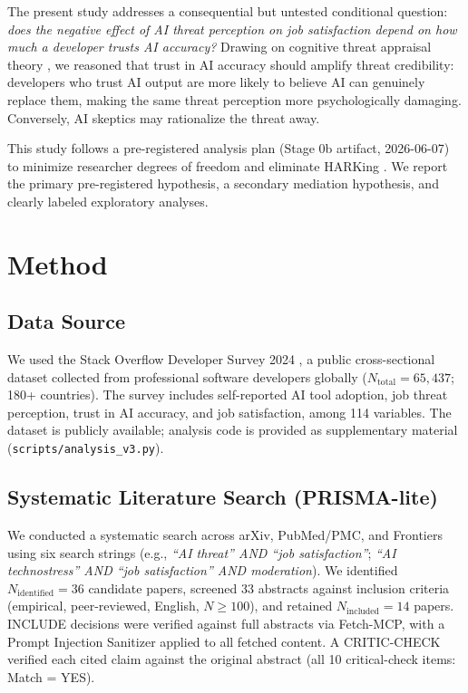 \documentclass[11pt]{article}
\begin{document}
The present study addresses a consequential but untested conditional question:
\textit{does the negative effect of AI threat perception on job satisfaction depend
on how much a developer trusts AI accuracy?} Drawing on cognitive threat appraisal
theory \citep{lazarus1984stress}, we reasoned that trust in AI accuracy should
amplify threat credibility: developers who trust AI output are more likely to
believe AI can genuinely replace them, making the same threat perception more
psychologically damaging. Conversely, AI skeptics may rationalize the threat away.

This study follows a pre-registered analysis plan (Stage 0b artifact, 2026-06-07)
to minimize researcher degrees of freedom and eliminate HARKing
\citep{schwabe2020automation}. We report the primary pre-registered hypothesis,
a secondary mediation hypothesis, and clearly labeled exploratory analyses.

\section{Method}

\subsection{Data Source}
We used the Stack Overflow Developer Survey 2024 \citep{stackoverflow2024}, a
public cross-sectional dataset collected from professional software developers
globally ($N_{\text{total}} = 65{,}437$; 180+ countries). The survey includes
self-reported AI tool adoption, job threat perception, trust in AI accuracy, and
job satisfaction, among 114 variables. The dataset is publicly available;
analysis code is provided as supplementary material (\texttt{scripts/analysis\_v3.py}).

\subsection{Systematic Literature Search (PRISMA-lite)}
We conducted a systematic search across arXiv, PubMed/PMC, and Frontiers using six
search strings (e.g., \textit{``AI threat'' AND ``job satisfaction''};
\textit{``AI technostress'' AND ``job satisfaction'' AND moderation}).
We identified $N_{\text{identified}} = 36$ candidate papers, screened 33 abstracts
against inclusion criteria (empirical, peer-reviewed, English, $N \geq 100$),
and retained $N_{\text{included}} = 14$ papers. INCLUDE decisions were verified
against full abstracts via Fetch-MCP, with a Prompt Injection Sanitizer applied
to all fetched content. A CRITIC-CHECK verified each cited claim against the
original abstract (all 10 critical-check items: Match = YES).
\end{document}
